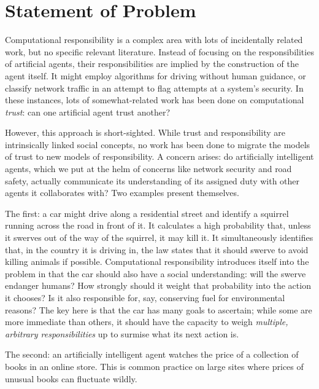 \section{Statement of Problem}\label{sec:statement_of_problem}

Computational responsibility is a complex area with lots of incidentally related work, but no specific relevant literature. Instead of focusing on the responsibilities of artificial agents, their responsibilities are implied by the construction of the agent itself. It might employ algorithms for driving without human guidance, or classify network traffic in an attempt to flag attempts at a system's security. In these instances, lots of somewhat-related work has been done on computational \emph{trust}: can one artificial agent trust another?\par

However, this approach is short-sighted. While trust and responsibility are intrinsically linked social concepts, no work has been done to migrate the models of trust to new models of responsibility. A concern arises: do artificially intelligent agents, which we put at the helm of concerns like network security and road safety, actually communicate its understanding of its assigned duty with other agents it collaborates with? Two examples present themselves.\par

The first: a car might drive along a residential street and identify a squirrel running across the road in front of it. It calculates a high probability that, unless it swerves out of the way of the squirrel, it may kill it. It simultaneously identifies that, in the country it is driving in, the law states that it should swerve to avoid killing animals if possible. Computational responsibility introduces itself into the problem in that the car should also have a social understanding: will the swerve endanger humans? How strongly should it weight that probability into the action it chooses? Is it also responsible for, say, conserving fuel for environmental reasons? The key here is that the car has many goals to ascertain; while some are more immediate than others, it should have the capacity to weigh \emph{multiple, arbitrary responsibilities} up to surmise what its next action is. \par

The second: an artificially intelligent agent watches the price of a collection of books in an online store. This is common practice on large sites where prices of unusual books can fluctuate wildly. 

